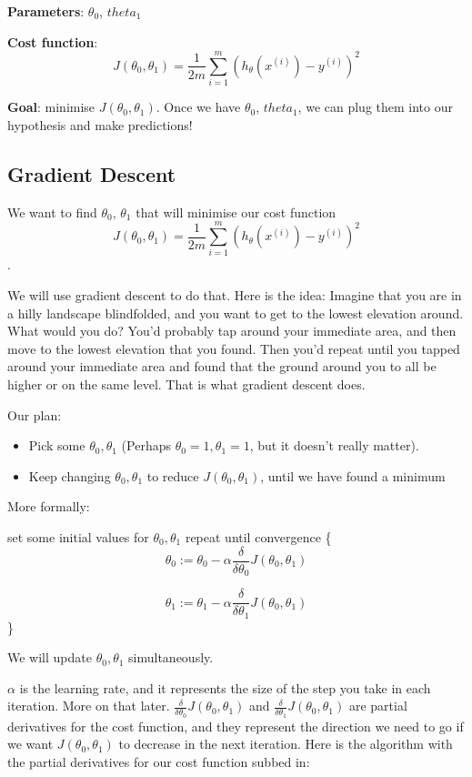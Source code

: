\documentclass[12pt]{article}
\begin{document}
\textbf{Parameters}: $\theta_0$, $theta_1$

\textbf{Cost function}: \[J(\theta_0, \theta_1) = \frac{1}{2m} \sum^m_{i=1}(h_\theta(x^{(i)}) - y^{(i)})^2\]

\textbf{Goal}: minimise $J(\theta_0, \theta_1)$. Once we have $\theta_0$, $theta_1$, we can plug them into our hypothesis and make predictions! 

\subsection{Gradient Descent}

We want to find $\theta_0$, $\theta_1$ that will minimise our cost function \[J(\theta_0, \theta_1) = \frac{1}{2m} \sum^m_{i=1}(h_\theta(x^{(i)}) - y^{(i)})^2\].

We will use gradient descent to do that. Here is the idea: Imagine that you are in a hilly landscape blindfolded, and you want to get to the lowest elevation around. What would you do? You'd probably tap around your immediate area, and then move to the lowest elevation that you found. Then you'd repeat until you tapped around your immediate area and found that the ground around you to all be higher or on the same level. That is what gradient descent does.

Our plan:
\begin{itemize}
\item Pick some $\theta_0, \theta_1$ (Perhaps $\theta_0=1, \theta_1=1$, but it doesn't really matter).
\item Keep changing  $\theta_0, \theta_1$ to reduce $J(\theta_0, \theta_1)$, until we have found a minimum 
\end{itemize}

More formally:

set some initial values for $\theta_0, \theta_1$
repeat until convergence \{
\[\theta_0 := \theta_0 - \alpha \frac{\delta}{\delta \theta_0} J(\theta_0, \theta_1)\]

\[\theta_1 := \theta_1 - \alpha \frac{\delta}{\delta \theta_1} J(\theta_0, \theta_1)\]
\}


We will update  $\theta_0, \theta_1$ simultaneously. 

$\alpha$ is the learning rate, and it represents the size of the step you take in each iteration. More on that later.  $\frac{\delta}{\delta \theta_0} J(\theta_0, \theta_1) $ and $\frac{\delta}{\delta \theta_1} J(\theta_0, \theta_1) $ are partial derivatives for the cost function, and they represent the direction we need to go if we want $J(\theta_0, \theta_1)$ to decrease in the next iteration. Here is the algorithm with the partial derivatives for our cost function subbed in:
\end{document}
